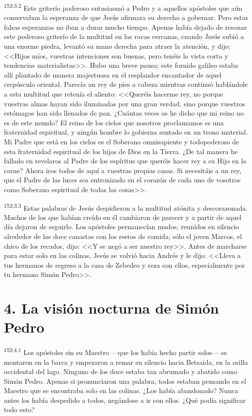\par 
\textsuperscript{152:3.2} Este griterío poderoso entusiasmó a Pedro y a aquellos apóstoles que aún conservaban la esperanza de que Jesús afirmara su derecho a gobernar. Pero estas falsas esperanzas no iban a durar mucho tiempo. Apenas había dejado de resonar este poderoso griterío de la multitud en las rocas cercanas, cuando Jesús subió a una enorme piedra, levantó su mano derecha para atraer la atención, y dijo: <<Hijos míos, vuestras intenciones son buenas, pero tenéis la vista corta y tendencias materialistas>>. Hubo una breve pausa; este fornido galileo estaba allí plantado de manera majestuosa en el resplandor encantador de aquel crepúsculo oriental. Parecía un rey de pies a cabeza mientras continuó hablándole a esta multitud que retenía el aliento: <<Queréis hacerme rey, no porque vuestras almas hayan sido iluminadas por una gran verdad, sino porque vuestros estómagos han sido llenados de pan. ¿Cuántas veces os he dicho que mi reino no es de este mundo? El reino de los cielos que nosotros proclamamos es una fraternidad espiritual, y ningún hombre lo gobierna sentado en un trono material. Mi Padre que está en los cielos es el Soberano omnisapiente y todopoderoso de esta fraternidad espiritual de los hijos de Dios en la Tierra. ¿De tal manera he fallado en revelaros al Padre de los espíritus que queréis hacer rey a su Hijo en la carne? Ahora iros todos de aquí a vuestras propias casas. Si necesitáis a un rey, que el Padre de las luces sea entronizado en el corazón de cada uno de vosotros como Soberano espiritual de todas las cosas>>.

\par 
\textsuperscript{152:3.3} Estas palabras de Jesús despidieron a la multitud atónita y descorazonada. Muchos de los que habían creído en él cambiaron de parecer y a partir de aquel día dejaron de seguirlo. Los apóstoles permanecían mudos, reunidos en silencio alrededor de las doce canastas con los restos de comida; sólo el joven Marcos, el chico de los recados, dijo: <<Y se negó a ser nuestro rey>>. Antes de marcharse para estar solo en las colinas, Jesús se volvió hacia Andrés y le dijo: <<Lleva a tus hermanos de regreso a la casa de Zebedeo y reza con ellos, especialmente por tu hermano Simón Pedro>>.

\section*{4. La visión nocturna de Simón Pedro}
\par 
\textsuperscript{152:4.1} Los apóstoles sin su Maestro ---que los había hecho partir solos--- se montaron en la barca y empezaron a remar en silencio hacia Betsaida, en la orilla occidental del lago. Ninguno de los doce estaba tan abrumado y abatido como Simón Pedro. Apenas si pronunciaron una palabra; todos estaban pensando en el Maestro que se encontraba solo en las colinas. ¿Los había abandonado? Nunca antes los había despedido a todos, negándose a ir con ellos. ¿Qué podía significar todo esto?

